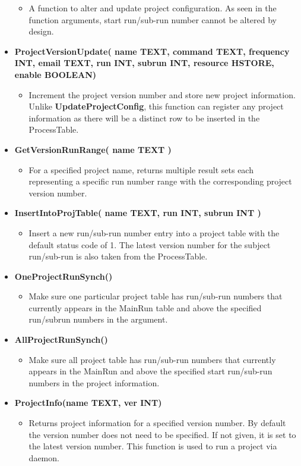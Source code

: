 \begin{itemize}
\begin{itemize}
      \item A function to alter and update project configuration. As seen in
        the function arguments, start run/sub-run number cannot be altered by
        design.
    \end{itemize}
  \item {\bf ProjectVersionUpdate( name TEXT, command TEXT, frequency INT,
    email TEXT, run INT, subrun INT, resource HSTORE, enable BOOLEAN)}
    \begin{itemize}
      \item Increment the project version number and store new project
        information. Unlike {\bf UpdateProjectConfig}, this function can
        register any project information as there will be a distinct row
        to be inserted in the ProcessTable.
    \end{itemize}
  \item {\bf GetVersionRunRange( name TEXT )}
    \begin{itemize}
      \item For a specified project name, returns multiple result sets each
        representing a specific run number range with the corresponding
        project version number.
    \end{itemize}
  \item {\bf InsertIntoProjTable( name TEXT, run INT, subrun INT )}
    \begin{itemize}
      \item Insert a new run/sub-run number entry into a project table with
        the default status code of 1. The latest version number for the
        subject run/sub-run is also taken from the ProcessTable.
    \end{itemize}
  \item {\bf OneProjectRunSynch()}
    \begin{itemize}
      \item Make sure one particular project table has run/sub-run 
        numbers that currently appears in the MainRun table and above
        the specified run/subrun numbers in the argument.
    \end{itemize}
  \item {\bf AllProjectRunSynch()}
    \begin{itemize}
      \item Make sure all project table has run/sub-run numbers that 
        currently appears in the MainRun and above the specified start
        run/sub-run numbers in the project information.
    \end{itemize}
  \item {\bf ProjectInfo(name TEXT, ver INT)}
    \begin{itemize}
      \item Returns project information for a specified version number.
        By default the version number does not need to be specified.
        If not given, it is set to the latest version number. This function
        is used to run a project via daemon.
    \end{itemize}
\end{itemize}

